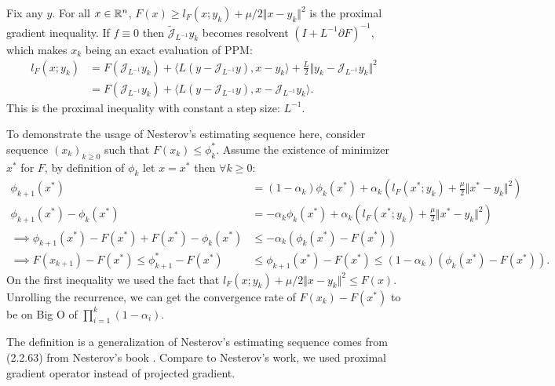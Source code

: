 \documentclass[12pt]{article}
\begin{document}
    \begin{observation}
        Fix any $y$. For all $x\in \mathbb R^n$, $F(x) \ge l_F(x; y_k) + \mu/2\Vert x - y_k\Vert^2$ is the proximal gradient inequality. 
        If $f \equiv 0$ then $\widetilde{\mathcal J}_{L^{-1}}y_k$ becomes resolvent $(I + L^{-1}\partial F)^{-1}$, which makes $x_k$ being an exact evaluation of PPM: 
        \begin{align*}
            l_F(x; y_k) 
            &= F(\mathcal J_{L^{-1}}y_k) 
            + \langle L(y - \mathcal J_{L^{-1}} y), x - y_k\rangle + \frac{L}{2}\Vert y_k - \mathcal J_{L^{-1}}y_k\Vert^2
            \\
            &= F(\mathcal J_{L^{-1}}y_k) 
            + \langle L(y - \mathcal J_{L^{-1}} y), x - \mathcal J_{L^{-1}}y_k\rangle. 
        \end{align*}
        This is the proximal inequality with constant a step size: $L^{-1}$. 
    \end{observation}
    To demonstrate the usage of Nesterov's estimating sequence here, consider sequence $(x_k)_{k \ge 0}$ such that $F(x_k) \le \phi_k^*$. 
    Assume the existence of minimizer $x^*$ for $F$, by definition of $\phi_k$ let $x = x^*$ then $\forall k \ge 0$: 
    {\small
    \begin{align*}
        \phi_{k + 1}(x^*)
        &= (1 - \alpha_k)\phi_k (x^*) + 
        \alpha_k 
        \left(
            l_F(x^*; y_k) + \frac{\mu}{2}\Vert x^* - y_k\Vert^2
        \right)
        \\
        \phi_{k + 1}(x^*) - \phi_k(x^*) &= 
        -\alpha_k\phi_k(x^*) 
        +
        \alpha_k
        \left(
            l_F(x^*; y_k) + \frac{\mu}{2}\Vert x^* - y_k\Vert^2
        \right) 
        \\
        \implies
        \phi_{k + 1}(x^*) - F(x^*) + F(x^*) - \phi_k(x^*) 
        &\le -\alpha_k(\phi_k(x^*) - F(x^*))
        \\
        \implies 
        F(x_{k + 1}) - F(x^*)
        \le \phi_{k + 1}^* - F(x^*)
        &\le \phi_{k + 1}(x^*) - F(x^*)
        \le 
        (1 - \alpha_k)(\phi_k(x^*) - F(x^*)). 
    \end{align*}
    }
    On the first inequality we used the fact that $l_F(x; y_k) + \mu/2\Vert x - y_k\Vert^2\le F(x)$. 
    Unrolling the recurrence, we can get the convergence rate of $F(x_k) - F(x^*)$ to be on Big O of $\prod_{i = 1}^k(1 - \alpha_i)$. 
    \begin{remark}
        The definition is a generalization of Nesterov's estimating sequence comes from (2.2.63) from Nesterov's book \cite{nesterov_lectures_2018}. 
        Compare to Nesterov's work, we used proximal gradient operator instead of projected gradient. 
    \end{remark}
\end{document}
